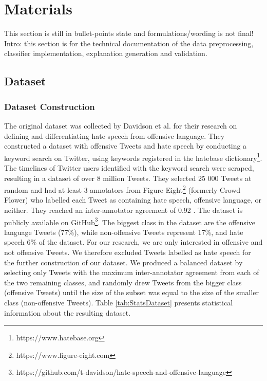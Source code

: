 \section{Materials}

{\color{blue}This section is still in bullet-points state and formulations/wording is not final!}\medskip \newline
Intro: this section is for the technical documentation of the data preprocessing, classifier implementation, explanation generation and validation. 


\subsection{Dataset}

\subsubsection{Dataset Construction}
The original dataset was collected by Davidson et al. \cite{davidson2017automated} for their research on defining and differentiating hate speech from offensive language. They constructed a dataset with offensive Tweets and hate speech by conducting a keyword search on Twitter, using keywords registered in the hatebase dictionary\footnote{https://www.hatebase.org}. The timelines of Twitter users identified with the keyword search were scraped, resulting in a dataset of over 8 million Tweets. They selected 25 000 Tweets at random and had at least 3 annotators from Figure Eight\footnote{https://www.figure-eight.com} (formerly Crowd Flower) who labelled each Tweet as containing hate speech, offensive language, or neither. They reached an inter-annotator agreement of 0.92 \cite{davidson2017automated}. The dataset is publicly available on GitHub\footnote{https://github.com/t-davidson/hate-speech-and-offensive-language}.\newline
The biggest class in the dataset are the offensive language Tweets (77\%), while non-offensive Tweets represent 17\%, and hate speech 6\% of the dataset. \newline
For our research, we are only interested in offensive and not offensive Tweets. We therefore excluded Tweets labelled as hate speech for the further construction of our dataset. We produced a balanced dataset by selecting only Tweets with the maximum inter-annotator agreement from each of the two remaining classes, and randomly drew Tweets from the bigger class (offensive Tweets) until the size of the subset was equal to the size of the smaller class (non-offensive Tweets). Table \ref{tab:StatsDataset} presents statistical information about the resulting dataset.
